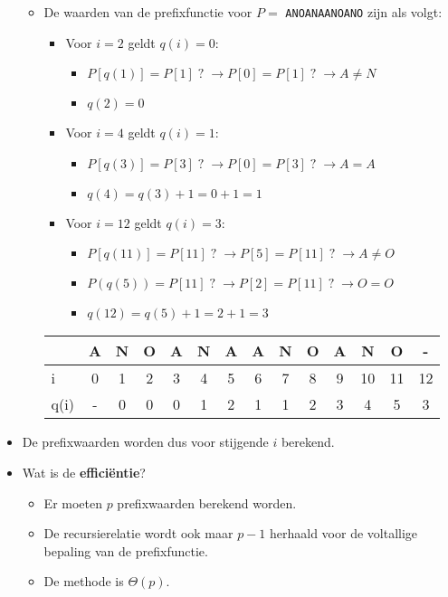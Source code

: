 \begin{itemize}
    \begin{itemize}
        \item De waarden van de prefixfunctie voor $P = $ \texttt{ANOANAANOANO} zijn als volgt:
        \begin{itemize}
            \item Voor $i = 2$ geldt $q(i) = 0$:
            \begin{itemize}
                \item $P[q(1)] = P[1]\;?\;\rightarrow P[0] = P[1]\;?\;\rightarrow A \neq N$
                \item $q(2) = 0$
            \end{itemize} 
            \item Voor $i = 4$ geldt $q(i) = 1$:
            \begin{itemize}
                \item $P[q(3)] = P[3]\;?\;\rightarrow P[0] = P[3]\;?\;\rightarrow A = A$
                \item $q(4) = q(3) + 1 = 0 + 1 = 1$
            \end{itemize}
            \item Voor $i = 12$ geldt $q(i) = 3$:
            \begin{itemize}
                \item $P[q(11)] = P[11]\;?\;\rightarrow P[5] = P[11]\;?\;\rightarrow A \neq O$
                \item $P(q(5)) = P[11]\;?\;\rightarrow P[2] = P[11]\;?\;\rightarrow O = O$
                \item $q(12) = q(5) + 1 = 2 + 1 = 3$
            \end{itemize}
        \end{itemize}

        \begin{table}[ht]
            \centering
            \begin{tabular}{l | c c c c c c c c c c c c c}
                     & A & N & O & A & N & A & A & N & O & A  & N  & O  & - \\
                     \hline
                i    & 0 & 1 & 2 & 3 & 4 & 5 & 6 & 7 & 8 & 9 & 10 & 11 & 12  \\
                q(i) & - & 0 & 0 & 0 & 1 & 2 & 1 & 1 & 2 & 3  & 4  & 5 & 3 
            \end{tabular}
        \end{table}
    \end{itemize}
    \item De prefixwaarden worden dus voor stijgende $i$ berekend.
    \item Wat is de \textbf{efficiëntie}?
    \begin{itemize}
        \item Er moeten $p$ prefixwaarden berekend worden.
        \item De recursierelatie wordt ook maar $p-1$ herhaald voor de voltallige bepaling van de prefixfunctie.
        \item De methode is $\Theta(p)$.
    \end{itemize}
\end{itemize}

